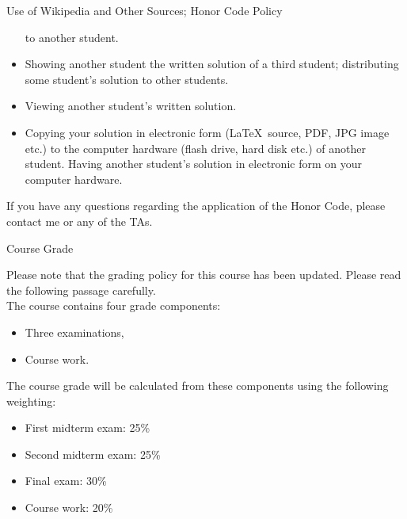 \documentclass[smaller,hyperref={CJKbookmarks=true}]{beamer}
\begin{document}
\begin{frame}{Use of Wikipedia and Other Sources; Honor Code Policy}
\begin{spacing}{1.15}
\begin{itemize}
to another student.
  \item Showing another student the written solution of a third student;
distributing some student's solution to other students.
  \item Viewing another student's written solution.
  \item Copying your solution in electronic form (\LaTeX~source, PDF, JPG
image etc.) to the computer hardware (flash drive, hard disk etc.) of
another student. Having another student's solution in electronic form
on your computer hardware.
\end{itemize}
If you have any questions regarding the application of the Honor Code,
please contact me or any of the TAs.
\end{spacing}
\end{frame}
\begin{frame}[c]{Course Grade}
\begin{spacing}{1.2}
Please note that the grading policy for this course has been updated.
Please read the following passage carefully.\\[6pt]
The course contains four grade components:
\begin{itemize}
  \item Three examinations,
  \item Course work.
\end{itemize}
The course grade will be calculated from these components using the
following weighting:
\begin{itemize}
  \item First midterm exam: 25\%
  \item Second midterm exam: 25\%
  \item Final exam: 30\%
  \item Course work: 20\%
\end{itemize}
\end{spacing}
\end{frame}
\end{document}
